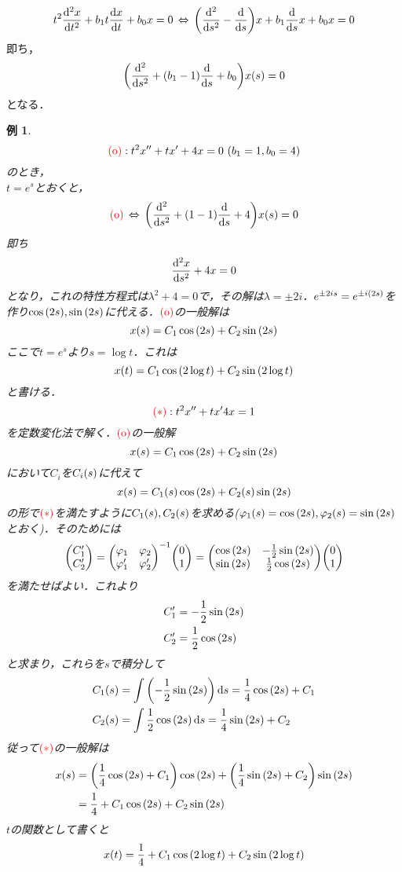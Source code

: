 \documentclass[autodetect-engine,dvipdfmx-if-dvi,ja=standard]{bxjsarticle}
\theoremstyle{mystyle1}
\theoremstyle{mystyle2}
\newtheorem{example}{例}
\newcommand{\redast}{\ensuremath{\color{red}\qty(\ast)\color{black}}}
\newcommand{\redo}{\ensuremath{\color{red}\qty(\textrm{o})\color{black}}}
\begin{document}
\[t^2\dv[2]{x}{t}+b_1t\dv{x}{t}+b_0x=0\,\Leftrightarrow\,\qty(\dv[2]{s}-\dv{s})x+b_1\dv{s}x+b_0x=0\]
即ち，
\[\qty(\dv[2]{s}+\qty(b_1-1)\dv{s}+b_0)x\qty(s)=0\]
となる．
\begin{example}
  \[\redo:t^2x^{\prime\prime}+tx^{\prime}+4x=0\ \qty(b_1=1,b_0=4)\]
  のとき，\\
  $t=e^s$とおくと，
  \[\redo\,\Leftrightarrow\,\qty(\dv[2]{s}+\qty(1-1)\dv{s}+4)x\qty(s)=0\]
  即ち
  \[\dv[2]{x}{s}+4x=0\]
  となり，これの特性方程式は$\lambda^2+4=0$で，その解は$\lambda=\pm 2i$．$e^{\pm 2is}=e^{\pm i\qty(2s)}$を作り$\cos\qty(2s),\sin\qty(2s)$に代える．\redo の一般解は
  \[x\qty(s)=C_1\cos\qty(2s)+C_2\sin\qty(2s)\]
  ここで$t=e^s$より$s=\log t$．これは
  \[x\qty(t)=C_1\cos\qty(2\log t)+C_2\sin\qty(2\log t)\]
  と書ける．
  \[\redast:t^2x^{\prime\prime}+tx^{\prime}4x=1\]
  を定数変化法で解く．\redo の一般解
  \[x\qty(s)=C_1\cos\qty(2s)+C_2\sin\qty(2s)\]
  において$C_i$を$C_i\qty(s)$に代えて
  \[x\qty(s)=C_1\qty(s)\cos\qty(2s)+C_2\qty(s)\sin\qty(2s)\]
  の形で\redast を満たすように$C_1\qty(s),C_2\qty(s)$を求める($\varphi_1\qty(s)=\cos\qty(2s),\varphi_2\qty(s)=\sin\qty(2s)$とおく)．そのためには
  \[\mqty(
    C_1^{\prime} \\
    C_2^{\prime}
    )=\mqty(
    \varphi_1 & \varphi_2 \\
    \varphi_1^{\prime} & \varphi_2^{\prime}
    )^{-1}\mqty(
    0 \\
    1
    )=\mqty(
    \cos\qty(2s) & -\frac{1}{2}\sin\qty(2s) \\
    \sin\qty(2s) & \frac{1}{2}\cos\qty(2s)
    )\mqty(
    0 \\
    1
    )\]
  を満たせばよい．これより
  \begin{align*}
    C_1^{\prime} & =-\frac{1}{2}\sin\qty(2s) \\
    C_2^{\prime} & =\frac{1}{2}\cos\qty(2s)
  \end{align*}
  と求まり，これらを$s$で積分して
  \begin{align*}
    C_1\qty(s) & =\int\qty(-\frac{1}{2}\sin\qty(2s))\dd{s}=\frac{1}{4}\cos\qty(2s)+C_1 \\
    C_2\qty(s) & =\int\frac{1}{2}\cos\qty(2s)\dd{s}=\frac{1}{4}\sin\qty(2s)+C_2
  \end{align*}
  従って\redast の一般解は
  \begin{align*}
    x\qty(s)
     & =\qty(\frac{1}{4}\cos\qty(2s)+C_1)\cos\qty(2s)+\qty(\frac{1}{4}\sin\qty(2s)+C_2)\sin\qty(2s) \\
     & =\frac{1}{4}+C_1\cos\qty(2s)+C_2\sin\qty(2s)
  \end{align*}
  $t$の関数として書くと
  \[x\qty(t)=\frac{1}{4}+C_1\cos\qty(2\log t)+C_2\sin\qty(2\log t)\]
\end{example}
\end{document}
